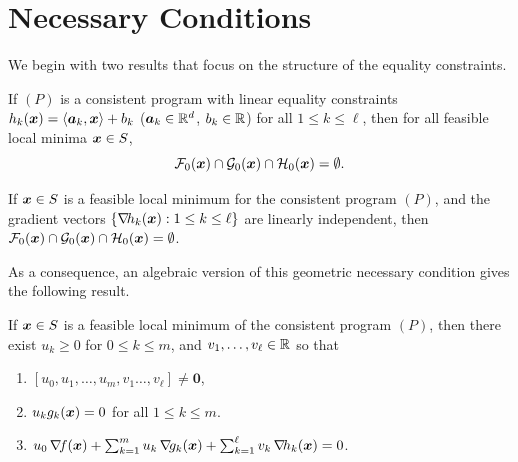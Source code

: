 
\section{Necessary Conditions}
We begin with two results that focus on the structure of the equality constraints.
\begin{theorem}
If $(P)$ is a consistent program with linear equality constraints $h_k(\boldsymbol{x}) = \langle \boldsymbol{a}_k, \boldsymbol{x} \rangle + b_k$ ($\boldsymbol{a}_k \in \mathbb{R}^d$, $b_k \in \mathbb{R}$) for all $1 \leq k \leq \ell$, then for all feasible local minima $\boldsymbol{x} \in S$,
\begin{equation*}
\mathcal{F}_0(\boldsymbol{x}) \cap \mathcal{G}_0(\boldsymbol{x}) \cap \mathcal{H}_0(\boldsymbol{x}) = \emptyset.
\end{equation*}
\end{theorem}

\begin{theorem}
If $\boldsymbol{x} \in S$ is a feasible local minimum for the consistent program $(P)$, and the gradient vectors $\{ \mathop{\nabla\! {h_k}}(\boldsymbol{x}) : 1 \leq k \leq \ell \}$ are linearly independent, then $\mathcal{F}_0(\boldsymbol{x}) \cap \mathcal{G}_0(\boldsymbol{x}) \cap \mathcal{H}_0(\boldsymbol{x}) = \emptyset$.
\end{theorem}

\separator

As a consequence, an algebraic version of this geometric necessary condition gives the following result.

\begin{theorem}
If $\boldsymbol{x} \in S$ is a feasible local minimum of the consistent program $(P)$, then there exist $u_k \geq 0$ for $0\leq k \leq m$, and $v_1, \dots, v_\ell \in \mathbb{R}$ so that
\begin{enumerate}
 	\item $[u_0, u_1, \dotsc, u_m, v_1 \dotsc, v_\ell ] \neq \boldsymbol{0}$,
 	\item $u_k g_k(\boldsymbol{x}) = 0$ for all $1 \leq k \leq m$.
 	\item $u_0 \mathop{\nabla\! {f}}(\boldsymbol{x}) + \sum_{k=1}^m u_k \mathop{\nabla\! {g_k}}(\boldsymbol{x}) + \sum_{k=1}^\ell v_k \mathop{\nabla\! {h_k}}(\boldsymbol{x}) = 0$.
 \end{enumerate}
\end{theorem}

